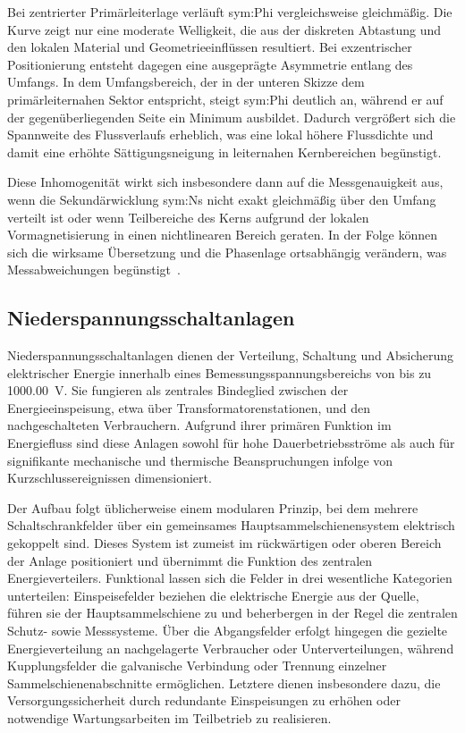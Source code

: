 Bei zentrierter Primärleiterlage verläuft \gls{sym:Phi} vergleichsweise gleichmäßig. Die Kurve zeigt nur eine moderate Welligkeit, die aus der diskreten Abtastung und den lokalen Material und Geometrieeinflüssen resultiert. Bei exzentrischer Positionierung entsteht dagegen eine ausgeprägte Asymmetrie entlang des Umfangs. In dem Umfangsbereich, der in der unteren Skizze dem primärleiternahen Sektor entspricht, steigt \gls{sym:Phi} deutlich an, während er auf der gegenüberliegenden Seite ein Minimum ausbildet. Dadurch vergrößert sich die Spannweite des Flussverlaufs erheblich, was eine lokal höhere Flussdichte und damit eine erhöhte Sättigungsneigung in leiternahen Kernbereichen begünstigt.

Diese Inhomogenität wirkt sich insbesondere dann auf die Messgenauigkeit aus, wenn die Sekundärwicklung \gls{sym:Ns} nicht exakt gleichmäßig über den Umfang verteilt ist oder wenn Teilbereiche des Kerns aufgrund der lokalen Vormagnetisierung in einen nichtlinearen Bereich geraten. In der Folge können sich die wirksame Übersetzung und die Phasenlage ortsabhängig verändern, was Messabweichungen begünstigt~\cite[S.~76]{book-Technologie_Messwandler-Minkner}.



\subsection{Niederspannungsschaltanlagen}
\label{sec:niederspannungsschaltanlagen}

Niederspannungsschaltanlagen dienen der Verteilung, Schaltung und Absicherung elektrischer Energie innerhalb eines Bemessungsspannungsbereichs von bis zu \SI{1000,00}{V}. Sie fungieren als zentrales Bindeglied zwischen der Energieeinspeisung, etwa über Transformatorenstationen, und den nachgeschalteten Verbrauchern. Aufgrund ihrer primären Funktion im Energiefluss sind diese Anlagen sowohl für hohe Dauerbetriebsströme als auch für signifikante mechanische und thermische Beanspruchungen infolge von Kurzschlussereignissen dimensioniert.

Der Aufbau folgt üblicherweise einem modularen Prinzip, bei dem mehrere Schaltschrankfelder über ein gemeinsames Hauptsammelschienensystem elektrisch gekoppelt sind. Dieses System ist zumeist im rückwärtigen oder oberen Bereich der Anlage positioniert und übernimmt die Funktion des zentralen Energieverteilers. Funktional lassen sich die Felder in drei wesentliche Kategorien unterteilen: Einspeisefelder beziehen die elektrische Energie aus der Quelle, führen sie der Hauptsammelschiene zu und beherbergen in der Regel die zentralen Schutz- sowie Messsysteme. Über die Abgangsfelder erfolgt hingegen die gezielte Energieverteilung an nachgelagerte Verbraucher oder Unterverteilungen, während Kupplungsfelder die galvanische Verbindung oder Trennung einzelner Sammelschienenabschnitte ermöglichen. Letztere dienen insbesondere dazu, die Versorgungssicherheit durch redundante Einspeisungen zu erhöhen oder notwendige Wartungsarbeiten im Teilbetrieb zu realisieren.

